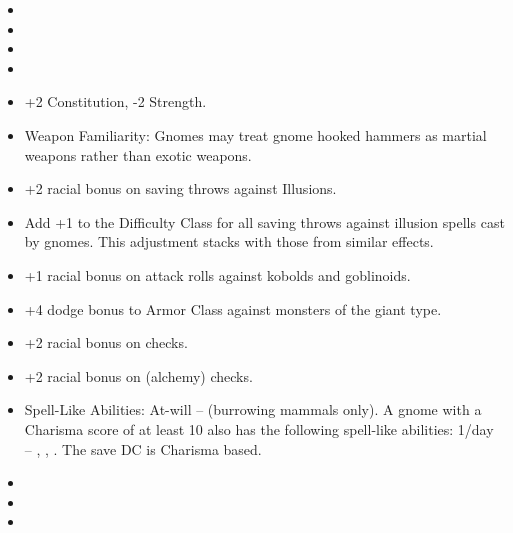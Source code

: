 

\begin{itemize}
\item {}
\item {}
\item {}
\item {}
\item +2 Constitution, -2 Strength.
\item Weapon Familiarity: Gnomes may treat gnome hooked hammers as martial weapons rather than exotic weapons.
\item +2 racial bonus on saving throws against Illusions.
\item Add +1 to the Difficulty Class for all saving throws against illusion spells cast by gnomes. This adjustment stacks with those from similar effects.
\item +1 racial bonus on attack rolls against kobolds and goblinoids.
\item +4 dodge bonus to Armor Class against monsters of the giant type.
\item +2 racial bonus on  checks.
\item +2 racial bonus on  (alchemy) checks.
\item Spell-Like Abilities: At-will --  (burrowing mammals only). A gnome with a Charisma score of at least 10 also has the following spell-like abilities: 1/day -- , , . The save DC is Charisma based.
\item {}
\item {}
\item {}
\end{itemize}
